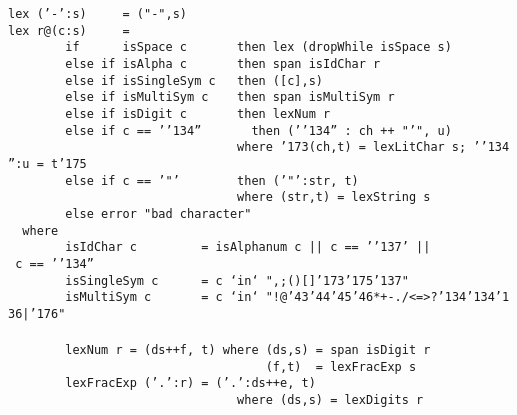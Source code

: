\mbox{\tt lex\ ('-':s)\ \ \ \ \ =\ ("-",s)}\\
\mbox{\tt lex\ r@(c:s)\ \ \ \ \ =\ }\\
\mbox{\tt \ \ \ \ \ \ \ \ if\ \ \ \ \ \ isSpace\ c\ \ \ \ \ \ \ then\ lex\ (dropWhile\ isSpace\ s)}\\
\mbox{\tt \ \ \ \ \ \ \ \ else\ if\ isAlpha\ c\ \ \ \ \ \ \ then\ span\ isIdChar\ r}\\
\mbox{\tt \ \ \ \ \ \ \ \ else\ if\ isSingleSym\ c\ \ \ then\ ([c],s)}\\
\mbox{\tt \ \ \ \ \ \ \ \ else\ if\ isMultiSym\ c\ \ \ \ then\ span\ isMultiSym\ r}\\
\mbox{\tt \ \ \ \ \ \ \ \ else\ if\ isDigit\ c\ \ \ \ \ \ \ then\ lexNum\ r}\\
\mbox{\tt \ \ \ \ \ \ \ \ else\ if\ c\ ==\ '{\char'134}''\ \ \ \ \ \ \ then\ ('{\char'134}''\ :\ ch\ ++\ "'",\ u)}\\
\mbox{\tt \ \ \ \ \ \ \ \ \ \ \ \ \ \ \ \ \ \ \ \ \ \ \ \ \ \ \ \ \ \ \ \ where\ {\char'173}(ch,t)\ =\ lexLitChar\ s;\ '{\char'134}'':u\ =\ t{\char'175}}\\
\mbox{\tt \ \ \ \ \ \ \ \ else\ if\ c\ ==\ '"'\ \ \ \ \ \ \ \ then\ ('"':str,\ t)}\\
\mbox{\tt \ \ \ \ \ \ \ \ \ \ \ \ \ \ \ \ \ \ \ \ \ \ \ \ \ \ \ \ \ \ \ \ where\ (str,t)\ =\ lexString\ s}\\
\mbox{\tt \ \ \ \ \ \ \ \ else\ error\ "bad\ character"}\\
\mbox{\tt \ \ where}\\
\mbox{\tt \ \ \ \ \ \ \ \ isIdChar\ c\ \ \ \ \ \ \ \ \ =\ isAlphanum\ c\ ||\ c\ ==\ '{\char'137}'\ ||\ c\ ==\ '{\char'134}''}\\
\mbox{\tt \ \ \ \ \ \ \ \ isSingleSym\ c\ \ \ \ \ \ =\ c\ `in`\ ",;()[]{\char'173}{\char'175}{\char'137}"}\\
\mbox{\tt \ \ \ \ \ \ \ \ isMultiSym\ c\ \ \ \ \ \ \ =\ c\ `in`\ "!@{\char'43}{\char'44}{\char'45}{\char'46}*+-./<=>?{\char'134}{\char'134}{\char'136}|{\char'176}"}\\
\mbox{\tt }\\
\mbox{\tt \ \ \ \ \ \ \ \ lexNum\ r\ =\ (ds++f,\ t)\ where\ (ds,s)\ =\ span\ isDigit\ r}\\
\mbox{\tt \ \ \ \ \ \ \ \ \ \ \ \ \ \ \ \ \ \ \ \ \ \ \ \ \ \ \ \ \ \ \ \ \ \ \ \ (f,t)\ \ =\ lexFracExp\ s}\\
\mbox{\tt \ \ \ \ \ \ \ \ lexFracExp\ ('.':r)\ =\ ('.':ds++e,\ t)}\\
\mbox{\tt \ \ \ \ \ \ \ \ \ \ \ \ \ \ \ \ \ \ \ \ \ \ \ \ \ \ \ \ \ \ \ \ where\ (ds,s)\ =\ lexDigits\ r}\\
